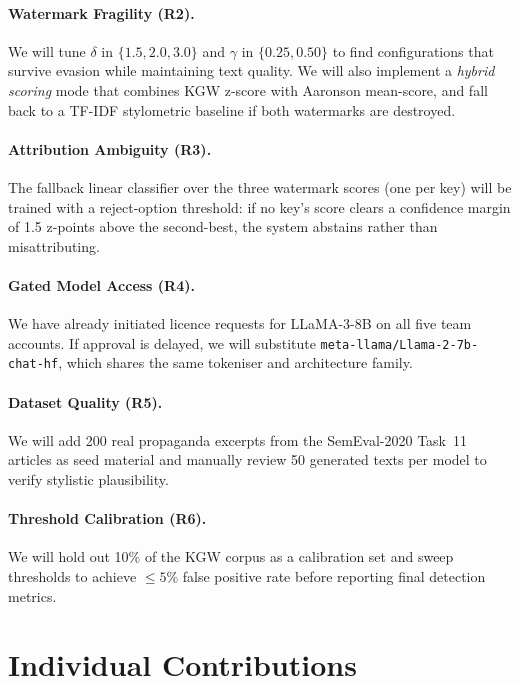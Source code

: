 \documentclass[11pt]{article}
\begin{document}
\paragraph{Watermark Fragility (R2).}
We will tune $\delta$ in $\{1.5, 2.0, 3.0\}$ and $\gamma$ in $\{0.25, 0.50\}$
to find configurations that survive evasion while maintaining text quality.  We
will also implement a \emph{hybrid scoring} mode that combines KGW z-score with
Aaronson mean-score, and fall back to a TF-IDF stylometric baseline if both
watermarks are destroyed.

\paragraph{Attribution Ambiguity (R3).}
The fallback linear classifier over the three watermark scores (one per key)
will be trained with a reject-option threshold: if no key's score clears a
confidence margin of 1.5 z-points above the second-best, the system abstains
rather than misattributing.

\paragraph{Gated Model Access (R4).}
We have already initiated licence requests for LLaMA-3-8B on all five team
accounts.  If approval is delayed, we will substitute
\texttt{meta-llama/Llama-2-7b-chat-hf}, which shares the same tokeniser and
architecture family.

\paragraph{Dataset Quality (R5).}
We will add 200 real propaganda excerpts from the SemEval-2020 Task~11 articles
as seed material and manually review 50 generated texts per model to verify
stylistic plausibility.

\paragraph{Threshold Calibration (R6).}
We will hold out 10\% of the KGW corpus as a calibration set and sweep
thresholds to achieve $\le 5\%$ false positive rate before reporting final
detection metrics.

\section{Individual Contributions}
\end{document}

